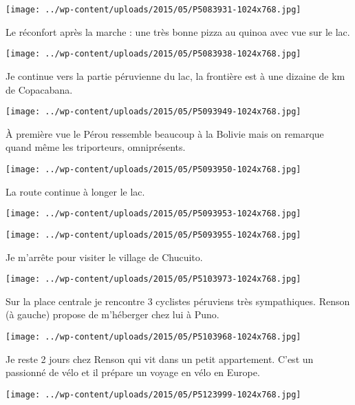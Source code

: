 \begin{center} \texttt{[image: ../wp-content/uploads/2015/05/P5083931-1024x768.jpg]} \end{center}

Le réconfort après la marche : une très bonne pizza au quinoa avec vue sur le lac. 
\begin{center} \texttt{[image: ../wp-content/uploads/2015/05/P5083938-1024x768.jpg]} \end{center}
\pagebreak

Je continue vers la partie péruvienne du lac, la frontière est à une dizaine de km de Copacabana. 
\begin{center} \texttt{[image: ../wp-content/uploads/2015/05/P5093949-1024x768.jpg]} \end{center}

À première vue le Pérou ressemble beaucoup à la Bolivie mais on remarque quand même les triporteurs, omniprésents. 
\begin{center} \texttt{[image: ../wp-content/uploads/2015/05/P5093950-1024x768.jpg]} \end{center}
\pagebreak

La route continue à longer le lac. 
\begin{center} \texttt{[image: ../wp-content/uploads/2015/05/P5093953-1024x768.jpg]} \end{center}
\begin{center} \texttt{[image: ../wp-content/uploads/2015/05/P5093955-1024x768.jpg]} \end{center}
\pagebreak

Je m'arrête pour visiter le village de Chucuito. 
\begin{center} \texttt{[image: ../wp-content/uploads/2015/05/P5103973-1024x768.jpg]} \end{center}

Sur la place centrale je rencontre 3 cyclistes péruviens très sympathiques. Renson (à gauche) propose de m'héberger chez lui à Puno. 
\begin{center} \texttt{[image: ../wp-content/uploads/2015/05/P5103968-1024x768.jpg]} \end{center}
\pagebreak

Je reste 2 jours chez Renson qui vit dans un petit appartement. C'est un passionné de vélo et il prépare un voyage en vélo en Europe. 
\begin{center} \texttt{[image: ../wp-content/uploads/2015/05/P5123999-1024x768.jpg]} \end{center}

